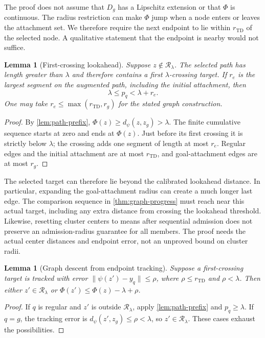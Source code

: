 \documentclass{article}
\newcommand{\Htd}{r_{\mathrm{TD}}}
\newcommand{\dd}{d_{\psi}}
\newcommand{\Rset}{\mathcal R_\lambda}
\newtheorem{lemma}[theorem]{Lemma}
\theoremstyle{definition}
\theoremstyle{remark}
\begin{document}
The proof does not assume that $D_g$ has a Lipschitz extension or that $\Phi$ is continuous.
The radius restriction can make $\Phi$ jump when a node enters or leaves the attachment
set. We therefore require the next endpoint to lie within $\Htd$ of the selected node.
A qualitative statement that the endpoint is nearby would not suffice.

\begin{lemma}[First-crossing lookahead]
\label{lem:overshoot}
Suppose $z\notin\Rset$. The selected path has length greater than $\lambda$ and
therefore contains a first $\lambda$-crossing target. If $r_e$ is the largest segment
on the augmented path, including the initial attachment, then
\[
 \lambda\le p_q<\lambda+r_e .
\]
One may take $r_e\le\max(\Htd,r_g)$ for the stated graph construction.
\end{lemma}
\begin{proof}
By \cref{lem:path-prefix}, $\Phi(z)\ge\dd(z,z_g)>\lambda$.
The finite cumulative sequence starts at zero and ends at $\Phi(z)$.
Just before its first crossing it is strictly below $\lambda$; the crossing adds
one segment of length at most $r_e$. Regular edges and the initial attachment are at
most $\Htd$, and goal-attachment edges are at most $r_g$.
\end{proof}
The selected target can therefore lie beyond the calibrated lookahead distance.
In particular, expanding the goal-attachment radius can create a much longer last edge.
The comparison sequence in \cref{thm:graph-progress} must reach near this actual target,
including any extra distance from crossing the lookahead threshold.
Likewise, resetting cluster centers to means after sequential admission does not
preserve an admission-radius guarantee for all members. The proof needs the actual
center distances and endpoint error, not an unproved bound on cluster radii.

\begin{lemma}[Graph descent from endpoint tracking]
\label{lem:tracking-descent}
Suppose a first-crossing target is tracked with error
$\|\psi(z')-y_q\|\le\rho$, where $\rho\le\Htd$ and $\rho<\lambda$.
Then either $z'\in\Rset$ or
$\Phi(z')\le\Phi(z)-\lambda+\rho$.
\end{lemma}
\begin{proof}
If $q$ is regular and $z'$ is outside $\Rset$, apply \cref{lem:path-prefix} and
$p_q\ge\lambda$. If $q=g$, the tracking error is
$\dd(z',z_g)\le\rho<\lambda$, so $z'\in\Rset$. These cases exhaust the possibilities.
\end{proof}
\end{document}
